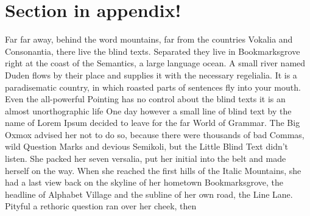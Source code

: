 \section{Section in appendix!}
\label{sec:appsection2}


Far far away, behind the word mountains, far from the countries Vokalia and
Consonantia, there live the blind texts. Separated they live in
Bookmarksgrove right at the coast of the Semantics, a large language
ocean. A small river named Duden flows by their place and supplies it with
the necessary regelialia. It is a paradisematic country, in which roasted
parts of sentences fly into your mouth. Even the all-powerful Pointing has
no control about the blind texts it is an almost unorthographic life One
day however a small line of blind text by the name of Lorem Ipsum decided
to leave for the far World of Grammar. The Big Oxmox advised her not to do
so, because there were thousands of bad Commas, wild Question Marks and
devious Semikoli, but the Little Blind Text didn't listen. She packed her
seven versalia, put her initial into the belt and made herself on the
way. When she reached the first hills of the Italic Mountains, she had a
last view back on the skyline of her hometown Bookmarksgrove, the headline
of Alphabet Village and the subline of her own road, the Line Lane. Pityful
a rethoric question ran over her cheek, then 